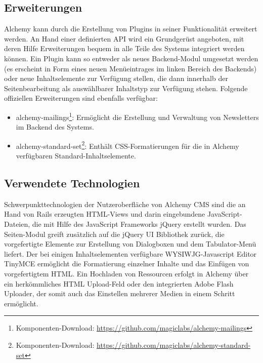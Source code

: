 \subsection{Erweiterungen}
Alchemy kann durch die Erstellung von Plugins in seiner Funktionalität erweitert werden. An Hand einer definierten API wird ein Grundgerüst angeboten, mit deren Hilfe Erweiterungen bequem in alle Teile des Systems integriert werden können. Ein Plugin kann so entweder als neues Backend-Modul umgesetzt werden (es erscheint in Form eines neuen Menüeintrages im linken Bereich des Backends) oder neue Inhaltselemente zur Verfügung stellen, die dann innerhalb der Seitenbearbeitung als auswählbarer Inhaltstyp zur Verfügung stehen.
\newline
\newline
Folgende offiziellen Erweiterungen sind ebenfalls verfügbar:
\begin{itemize}
\item
alchemy-mailings\footnote{Komponenten-Download: \href{https://github.com/magiclabs/alchemy-mailings}{https://github.com/magiclabs/alchemy-mailings}}: Ermöglicht die Erstellung und Verwaltung von Newsletters im Backend des Systems.
\item
alchemy-standard-set\footnote{Komponenten-Download: \href{ https://github.com/magiclabs/alchemy-standard-set}{ https://github.com/magiclabs/alchemy-standard-set}}: Enthält CSS-Formatierungen für die in Alchemy verfügbaren Standard-Inhaltselemente.
\end{itemize}
\subsection{Verwendete Technologien}
Schwerpunkttechnologien der Nutzeroberfläche von Alchemy CMS sind die an Hand von Rails erzeugten HTML-Views und darin eingebundene JavaScript-Dateien, die mit Hilfe des JavaScript Frameworks jQuery erstellt wurden.
Das Seiten-Modul greift zusätzlich auf die jQuery UI Bibliothek zurück, die vorgefertigte Elemente zur Erstellung von Dialogboxen und dem Tabulator-Menü liefert.
Der bei einigen Inhaltselementen verfügbare WYSIWJG-Javascript Editor TinyMCE ermöglicht die Formatierung einzelner Inhalte und das Einfügen von vorgefertigtem HTML.
Ein Hochladen von Ressourcen erfolgt in Alchemy über ein herkömmliches HTML Upload-Feld oder den integrierten Adobe Flash Uploader, der somit auch das Einstellen mehrerer Medien in einem Schritt ermöglicht.




